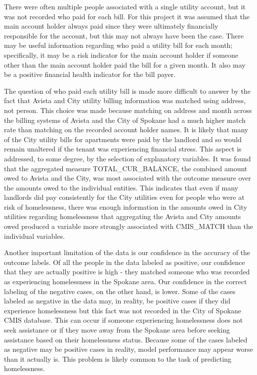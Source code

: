 \documentclass[10pt,letterpaper]{article}
\begin{document}
There were often multiple people associated with a single utility account, but it was not recorded who paid for each bill. For this project it was assumed that the main account holder always paid since they were ultimately financially responsible for the account, but this may not always have been the case. There may be useful information regarding who paid a utility bill for each month; specifically, it may be a risk indicator for the main account holder if someone other than the main account holder paid the bill for a given month. It also may be a positive financial health indicator for the bill payer.

The question of who paid each utility bill is made more difficult to answer by the fact that Avista and City utility billing information was matched using address, not person. This choice was made because matching on address and month across the billing systems of Avista and the City of Spokane had a much higher match rate than matching on the recorded account holder names. It is likely that many of the City utility bills for apartments were paid by the landlord and so would remain unaltered if the tenant was experiencing financial stress. This aspect is addressed, to some degree, by the selection of explanatory variables. It was found that the aggregated measure TOTAL\_CUR\_BALANCE, the combined amount owed to Avista and the City, was most associated with the outcome measure over the amounts owed to the individual entities. This indicates that even if many landlords did pay consistently for the City utilities even for people who were at risk of homelessness, there was enough information in the amounts owed in City utilities regarding homelessness that aggregating the Avista and City amounts owed produced a variable more strongly associated with CMIS\_MATCH than the individual variables.

Another important limitation of the data is our confidence in the accuracy of the outcome labels. Of all the people in the data labeled as positive, our confidence that they are actually positive is high - they matched someone who was recorded as experiencing homelessness in the Spokane area. Our confidence in the correct labeling of the negative cases, on the other hand, is lower. Some of the cases labeled as negative in the data may, in reality, be positive cases if they did experience homelessness but this fact was not recorded in the City of Spokane CMIS database. This can occur if someone experiencing homelessness does not seek assistance or if they move away from the Spokane area before seeking assistance based on their homelessness status. Because some of the cases labeled as negative may be positive cases in reality, model performance may appear worse than it actually is. This problem is likely common to the task of predicting homelessness.
\end{document}
